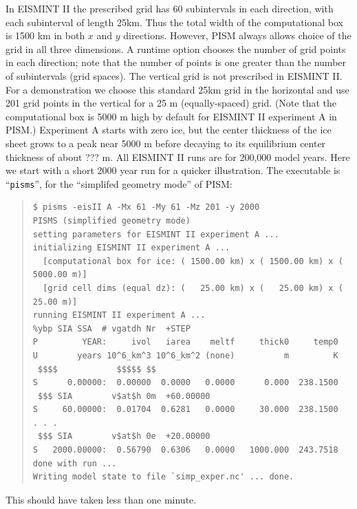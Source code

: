 \documentclass[11pt,final]{amsart}
\renewcommand{\t}[1]{\texttt{#1}}
\begin{document}

In EISMINT II the prescribed grid has 60 subintervals in each direction, with each subinterval of length 25km.  Thus the total width of the computational box is 1500 km in both $x$ and $y$ directions.  However, PISM always allows choice of the grid in all three dimensions.  A runtime option chooses the number of grid points in each direction; note that the number of points is one greater than the number of subintervals (grid spaces).  The vertical grid is not prescribed in EISMINT II.  For a demonstration we choose this standard 25km grid in the horizontal and use 201 grid points in the vertical for a 25 m (equally-spaced) grid.  (Note that the computational box is 5000 m high by default for EISMINT II experiment A in PISM.)  Experiment A starts with zero ice, but the center thickness of the ice sheet grows to a peak near 5000 m before decaying to its equilibrium center thickness of about ??? m.  All EISMINT II runs are for 200,000 model years.  Here we start with a short 2000 year run for a quicker illustration.  The executable is ``\t{pisms}'', for the ``simplifed geometry mode'' of PISM:

\small\begin{quote}\begin{verbatim}
$ pisms -eisII A -Mx 61 -My 61 -Mz 201 -y 2000
PISMS (simplified geometry mode)
setting parameters for EISMINT II experiment A ... 
initializing EISMINT II experiment A ... 
  [computational box for ice: ( 1500.00 km) x ( 1500.00 km) x ( 5000.00 m)]
  [grid cell dims (equal dz): (   25.00 km) x (   25.00 km) x (   25.00 m)]
running EISMINT II experiment A ...
%ybp SIA SSA  # vgatdh Nr  +STEP
P         YEAR:     ivol   iarea    meltf     thick0     temp0
U        years 10^6_km^3 10^6_km^2 (none)          m         K
 $$$$            $$$$$ $$
S      0.00000:  0.00000  0.0000   0.0000      0.000  238.1500
 $$$ SIA        v$at$h 0m  +60.00000
S     60.00000:  0.01704  0.6281   0.0000     30.000  238.1500
. . .
 $$$ SIA        v$at$h 0e  +20.00000
S   2000.00000:  0.56790  0.6306   0.0000   1000.000  243.7518
done with run ... 
Writing model state to file `simp_exper.nc' ... done.
\end{verbatim}
\end{quote}\normalsize
\noindent This should have taken less than one minute.
\end{document}
